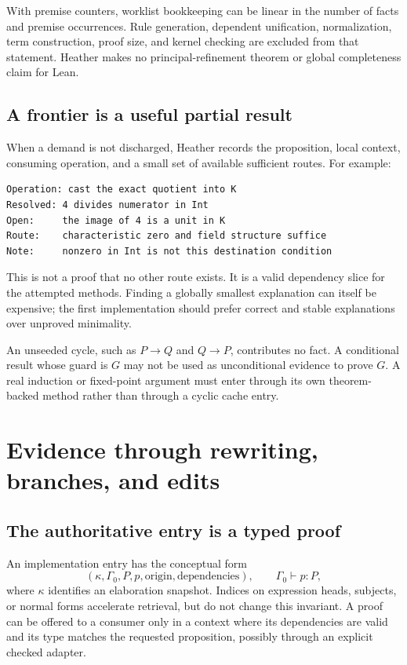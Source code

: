 \documentclass[11pt,letterpaper]{article}
\newcommand{\typing}{\vdash}
\theoremstyle{definition}\newtheorem{definition}[theorem]{Definition}
\theoremstyle{remark}\newtheorem{remark}[theorem]{Remark}
\begin{document}
With premise counters, worklist bookkeeping can be linear in the number of
facts and premise occurrences. Rule generation, dependent unification,
normalization, term construction, proof size, and kernel checking are excluded
from that statement. Heather makes no principal-refinement theorem or global
completeness claim for Lean.

\subsection{A frontier is a useful partial result}
When a demand is not discharged, Heather records the proposition, local
context, consuming operation, and a small set of available sufficient routes.
For example:
\par\noindent\begin{minipage}{\linewidth}
\begin{lstlisting}
Operation: cast the exact quotient into K
Resolved: 4 divides numerator in Int
Open:     the image of 4 is a unit in K
Route:    characteristic zero and field structure suffice
Note:     nonzero in Int is not this destination condition
\end{lstlisting}
\end{minipage}\par
This is not a proof that no other route exists. It is a valid dependency slice
for the attempted methods. Finding a globally smallest explanation can itself
be expensive; the first implementation should prefer correct and stable
explanations over unproved minimality.

An unseeded cycle, such as $P\to Q$ and $Q\to P$, contributes no fact. A
conditional result whose guard is $G$ may not be used as unconditional evidence
to prove $G$. A real induction or fixed-point argument must enter through its
own theorem-backed method rather than through a cyclic cache entry.

\section{Evidence through rewriting, branches, and edits}\label{sec:lifetime}

\subsection{The authoritative entry is a typed proof}
An implementation entry has the conceptual form
\[
 (\kappa,\Gamma_0, P, p, \text{origin}, \text{dependencies}),
 \qquad\Gamma_0\typing p:P,
\]
where $\kappa$ identifies an elaboration snapshot. Indices on expression heads,
subjects, or normal forms accelerate retrieval, but do not change this invariant.
A proof can be offered to a consumer only in a context where its dependencies
are valid and its type matches the requested proposition, possibly through an
explicit checked adapter.
\end{document}
